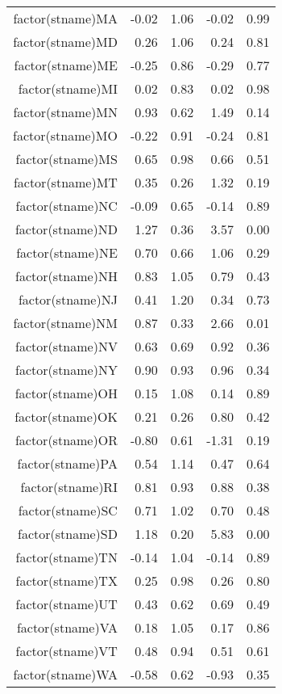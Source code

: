 \begin{table}[ht]
\begin{tabular}{rrrrr}
  factor(stname)MA & -0.02 & 1.06 & -0.02 & 0.99 \\ 
  factor(stname)MD & 0.26 & 1.06 & 0.24 & 0.81 \\ 
  factor(stname)ME & -0.25 & 0.86 & -0.29 & 0.77 \\ 
  factor(stname)MI & 0.02 & 0.83 & 0.02 & 0.98 \\ 
  factor(stname)MN & 0.93 & 0.62 & 1.49 & 0.14 \\ 
  factor(stname)MO & -0.22 & 0.91 & -0.24 & 0.81 \\ 
  factor(stname)MS & 0.65 & 0.98 & 0.66 & 0.51 \\ 
  factor(stname)MT & 0.35 & 0.26 & 1.32 & 0.19 \\ 
  factor(stname)NC & -0.09 & 0.65 & -0.14 & 0.89 \\ 
  factor(stname)ND & 1.27 & 0.36 & 3.57 & 0.00 \\ 
  factor(stname)NE & 0.70 & 0.66 & 1.06 & 0.29 \\ 
  factor(stname)NH & 0.83 & 1.05 & 0.79 & 0.43 \\ 
  factor(stname)NJ & 0.41 & 1.20 & 0.34 & 0.73 \\ 
  factor(stname)NM & 0.87 & 0.33 & 2.66 & 0.01 \\ 
  factor(stname)NV & 0.63 & 0.69 & 0.92 & 0.36 \\ 
  factor(stname)NY & 0.90 & 0.93 & 0.96 & 0.34 \\ 
  factor(stname)OH & 0.15 & 1.08 & 0.14 & 0.89 \\ 
  factor(stname)OK & 0.21 & 0.26 & 0.80 & 0.42 \\ 
  factor(stname)OR & -0.80 & 0.61 & -1.31 & 0.19 \\ 
  factor(stname)PA & 0.54 & 1.14 & 0.47 & 0.64 \\ 
  factor(stname)RI & 0.81 & 0.93 & 0.88 & 0.38 \\ 
  factor(stname)SC & 0.71 & 1.02 & 0.70 & 0.48 \\ 
  factor(stname)SD & 1.18 & 0.20 & 5.83 & 0.00 \\ 
  factor(stname)TN & -0.14 & 1.04 & -0.14 & 0.89 \\ 
  factor(stname)TX & 0.25 & 0.98 & 0.26 & 0.80 \\ 
  factor(stname)UT & 0.43 & 0.62 & 0.69 & 0.49 \\ 
  factor(stname)VA & 0.18 & 1.05 & 0.17 & 0.86 \\ 
  factor(stname)VT & 0.48 & 0.94 & 0.51 & 0.61 \\ 
  factor(stname)WA & -0.58 & 0.62 & -0.93 & 0.35 \\ 

\end{tabular}
\end{table}
